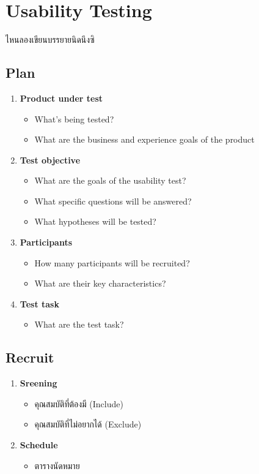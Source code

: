 \section{Usability Testing}
ไหนลองเขียนบรรยายนิดนึงซิ
\subsection{Plan}
\begin{enumerate}
    \item \textbf{Product under test}
          \begin{itemize}
            \item What's being tested?
            \item What are the business and experience goals of the product
          \end{itemize}
    \item \textbf{Test objective}
          \begin{itemize}
              \item What are the goals of the usability test?
              \item What specific questions will be answered?
              \item What hypotheses will be tested?
          \end{itemize}
    \item \textbf{Participants}
          \begin{itemize}
              \item How many participants will be recruited?
              \item What are their key characteristics?
          \end{itemize}
    \item \textbf{Test task}
          \begin{itemize}
              \item What are the test task?
          \end{itemize}
\end{enumerate}
\subsection{Recruit}
\begin{enumerate}
    \item \textbf{Sreening}
          \begin{itemize}
            \item คุณสมบัติที่ต้องมี (Include)
            \item คุณสมบัติที่ไม่อยากได้ (Exclude)
          \end{itemize}
    \item \textbf{Schedule}
          \begin{itemize}
              \item ตารางนัดหมาย
          \end{itemize}
\end{enumerate}
